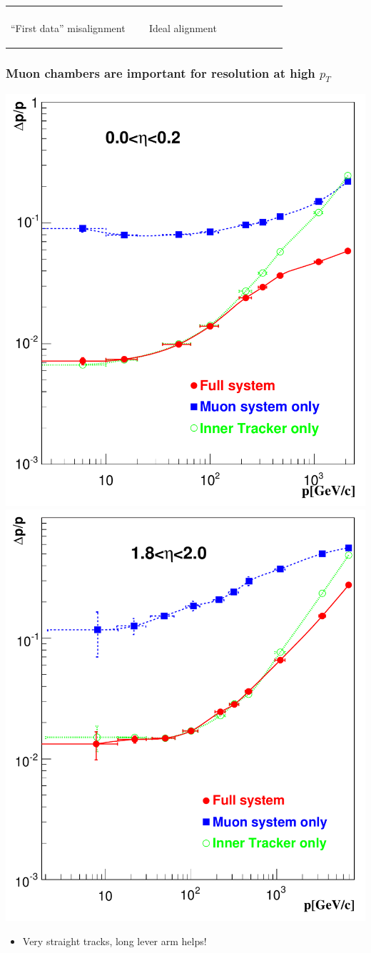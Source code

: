 \documentclass[compress]{beamer}
\begin{document}
\begin{frame}
\begin{tabular}{p{0.45\linewidth} p{0.45\linewidth}}
\begin{minipage}{\linewidth}
  \end{minipage} \\
  \begin{minipage}{\linewidth}
    \begin{center}
      \mbox{\hspace{0.25 cm}} ``First data'' misalignment
    \end{center}
  \end{minipage} &
  \begin{minipage}{\linewidth}
    \begin{center}
      \mbox{\hspace{0.25 cm}} Ideal alignment
    \end{center}
  \end{minipage}
\end{tabular}
\end{frame}

\begin{frame}
\frametitle{Muon chambers are important for resolution at high $p_T$}
\begin{center}
\includegraphics[width=0.45\linewidth]{plots/zmumu/Figure_001-005-a.pdf}
\includegraphics[width=0.45\linewidth]{plots/zmumu/Figure_001-005-b.pdf}
\end{center}

\vspace{-0.5 cm}
\begin{itemize}
  \item Very straight tracks, long lever arm helps!
\end{itemize}
\end{frame}
\end{document}
